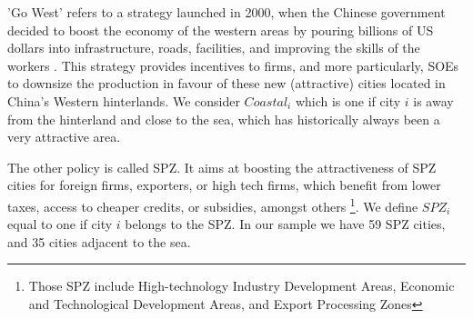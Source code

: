 \documentclass[12pt]{article}
\begin{document}
'Go West' refers to a strategy launched in 2000, when the Chinese government decided to boost the economy of the western areas by pouring billions of US dollars into infrastructure, roads, facilities, and improving the skills of the workers \citep{Chen2018-bs}. This strategy provides incentives to firms, and more particularly, SOEs to downsize the production in favour of these new (attractive) cities located in China's Western hinterlands. We consider 
 $Coastal_i$ which is one if city $i$ is away from the hinterland and close to the sea, which has historically always been a very attractive area.
 
 The other policy is called SPZ. It aims at boosting the attractiveness of SPZ cities for foreign firms, exporters, or high tech firms, which benefit from lower taxes, access to cheaper credits, or subsidies, amongst others \citep{Wang2008-gv, Hering2014-af}\footnote{Those SPZ include High-technology Industry Development Areas, Economic and Technological Development Areas, and Export Processing Zones}. We define $SPZ_i$ equal to one if city $i$ belongs to the SPZ. In our sample we have 59 SPZ cities, and 35 cities adjacent to the sea.
 
\end{document}
